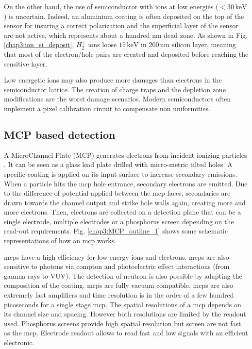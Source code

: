 \begin{refsection}
  On the other hand, the use of semiconductor with ions at low energies ($< 30 \,\mathrm{keV}$) is uncertain. Indeed, an aluminium coating is often deposited on the top of the sensor for insuring a correct polarization and the superficial layer of the sensor are not active, which represents about a hundred nm dead zone. As shown in Fig. \ref{chap3:ion_si_deposit}, $H_{2}^{+}$ ions loose $15\,\mathrm{keV}$ in $200\,\mathrm{nm}$ silicon layer, meaning that most of the electron/hole pairs are created and deposited before reaching the sensitive layer.

  Low energetic ions may also produce more damages than electrons in the semiconductor lattice. The creation of charge traps and the depletion zone modifications are the worst damage scenarios. Modern semiconductors often implement a pixel calibration circuit to compensate non uniformities.

  \subsection{MCP based detection}

  A MicroChannel Plate (MCP) generates electrons from incident ionizing particles \cite{Wiza1979}.
  It can be seen as a glass lead plate drilled with micro-metric tilted holes.
  A specific coating is applied on its input surface to increase secondary emissions. When a particle hits the \acrshort{mcp} hole entrance, secondary electrons are emitted. Due to the difference of potential applied between the \acrshort{mcp} faces, secondaries are drawn towards the channel output and strike hole walls again, creating more and more electrons. Then, electrons are collected on a detection plane that can be a single electrode, multiple electrodes or a phosphorus screen depending on the read-out requirements. Fig. \ref{chap3:MCP_outline_1} shows some schematic representations of how an \acrshort{mcp} works.

  \acrshort{mcp}s have a high efficiency for low energy ions and electrons. \acrshort{mcp}s are also sensitive to photons via compton and photoelectric effect interactions (from gamma rays to VUV). The detection of neutron is  also possible by adapting the composition of the coating. \acrshort{mcp}s are fully vacuum compatible. \acrshort{mcp}s are also extremely fast amplifiers and time resolution is in the order of a few hundred picoseconds for a single stage \acrshort{mcp}. The spatial resolutions of a \acrshort{mcp} depends on its channel size and spacing. However both resolutions are limited by the readout used. Phosphorus screens provide high spatial resolution but screen are not fast as the \acrshort{mcp}. Electrode readout allows to read fast and low signals with an efficient electronic.


\end{refsection}
